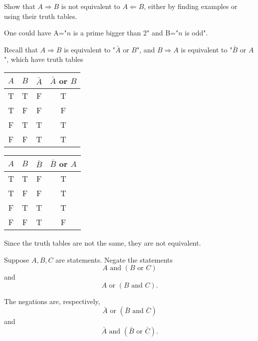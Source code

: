 \documentclass[11pt,dvipsnames]{book}
\numberwithin{figure}{section} %
\numberwithin{table}{section} %
\begin{document}
\begin{exercise}
Show that $A\Rightarrow B$ is not equivalent to $A\Leftarrow B$, either by finding examples or using their truth tables.
\begin{solution}
One could have A="$n$ is a prime bigger than 2" and B="$n$ is odd".

Recall that $A\Rightarrow B$ is equivalent to "$\bar{A}$ or $B$", and  $B\Rightarrow A$ is equivalent to "$\bar{B}$ or $A$", which have truth tables
\begin{center}
\begin{multicols}{2}
\begin{tabular}{ c|c|c|c}
$A$ & $B$ & $\bar{A}$ & $\bar{A}$ or ${B}$  \\ \hline
T & T & F  & T \\
T & F & F  & F \\
F & T & T  & T \\
F & F &  T  &  T \\
\end{tabular}

\begin{tabular}{ c|c|c|c}
$A$ & $B$ & $\bar{B}$ & $\bar{B}$ or ${A}$  \\ \hline
T & T & F  & T \\
T & F & F  & T \\
F & T & T  & T \\
F & F &  T  &  F \\
\end{tabular}

\end{multicols}
Since the truth tables are not the same, they are not equivalent.

\end{center}

\end{solution}
\end{exercise}

\begin{exercise}
Suppose $A,B,C$ are statements. Negate the statements
\[
A\mbox{ and }(B \mbox{ or }C)\]
and
\[
A\mbox{ or }(B \mbox{ and }C)
.
\]
\begin{solution}
The negations are, respectively,
\[
\bar{A} \mbox{ or } (\bar{B}\mbox{ and }\bar{C})
\]
and
\[
\bar{A} \mbox{ and } (\bar{B}\mbox{ or }\bar{C}).
\]
\end{solution}

\end{exercise}
\end{document}

